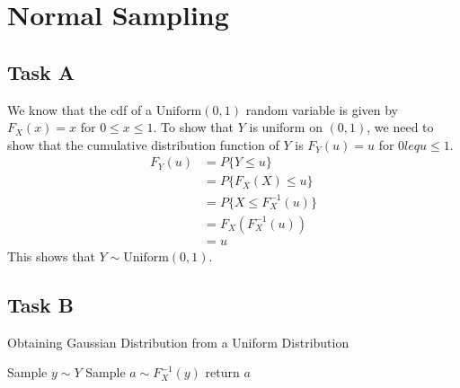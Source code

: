 \section{Normal Sampling}
\subsection*{Task A}
We know that the cdf of a $\textrm{Uniform}(0,1)$ random variable is given by $F_X(x) = x$ for $0\leq x\leq 1$.
To show that $Y$ is uniform on $(0, 1)$, we need to show that the cumulative distribution function of $Y$ is $F_Y(u) = u$ for $0 leq u \leq 1$.
\begin{align*}
	F_Y(u) & = P\{Y \leq u\}           \\
	       & = P\{F_X(X) \leq u\}      \\
	       & = P\{X \leq F_X^{-1}(u)\} \\
	       & = F_X(F_X^{-1}(u))        \\
	       & = u
\end{align*}
This shows that $Y \sim \textrm{Uniform}(0,1)$.

\subsection*{Task B}
\begin{algorithm}
	\caption{Obtaining Gaussian Distribution from a Uniform Distribution}
	\begin{algorithmic}
		\State Sample $y \sim Y$
		\State Sample $a\sim F_X^{-1}(y)$
		\State return $a$
	\end{algorithmic}
\end{algorithm}



